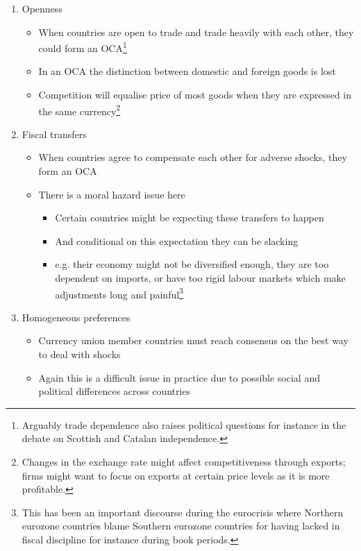 \documentclass{tufte-handout}
\begin{document}
\begin{enumerate}
	\item Openness
	\begin{itemize}
	  \item When countries are open to trade and trade heavily with each other, they could form an OCA\footnote{Arguably trade dependence also raises political questions for instance in the debate on Scottish and Catalan independence.}
	  \item In an OCA the distinction between domestic and foreign goods is lost
	  \item Competition will equalise price of most goods when they are expressed in the same currency\footnote{Changes in the exchange rate might affect competitiveness through exports; firms might want to focus on exports at certain price levels as it is more profitable.}
	\end{itemize}

 	\item Fiscal transfers
 	\begin{itemize}
 	  \item When countries agree to compensate each other for adverse shocks, they form an OCA
 	  \item There is a moral hazard issue here
 	  \begin{itemize}
 	    \item Certain countries might be expecting these transfers to happen
 	    \item And conditional on this expectation they can be slacking
 	    \item e.g. their economy might not be diversified enough, they are too dependent on imports, or have too rigid labour markets which make adjustments long and painful\footnote{This has been an important discourse during the eurocrisis where Northern eurozone countries blame Southern eurozone countries for having lacked in fiscal discipline for instance during book periods.}
 	  \end{itemize}
 	\end{itemize}

	\item Homogeneous preferences
	\begin{itemize}
	  \item Currency union member countries must reach consensus on the best way to deal with shocks
	  \item Again this is a difficult issue in practice due to possible social and political differences across countries
	\end{itemize}


\end{enumerate}
\end{document}
